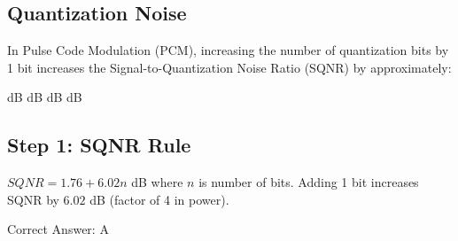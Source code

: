 \subsection{Quantization Noise}

In Pulse Code Modulation (PCM), increasing the number of quantization bits by 1 bit increases the Signal-to-Quantization Noise Ratio (SQNR) by approximately:

\begin{choices}
     dB
     dB
     dB
     dB
\end{choices}

\begin{solution}

\subsection*{Step 1: SQNR Rule}
$SQNR = 1.76 + 6.02 n$ dB where $n$ is number of bits. Adding 1 bit increases SQNR by $6.02$ dB (factor of 4 in power).

Correct Answer: A
\end{solution}

\clearpage

